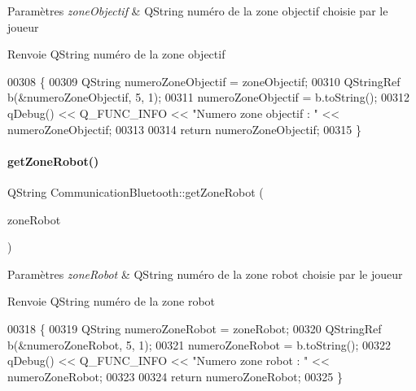 \begin{DoxyParams}{Paramètres}
{\em zone\+Objectif} & Q\+String numéro de la zone objectif choisie par le joueur \\
\hline
\end{DoxyParams}
\begin{DoxyReturn}{Renvoie}
Q\+String numéro de la zone objectif 
\end{DoxyReturn}

\begin{DoxyCode}
00308 \{
00309     QString numeroZoneObjectif = zoneObjectif;
00310     QStringRef b(&numeroZoneObjectif, 5, 1);
00311     numeroZoneObjectif = b.toString();
00312     qDebug() << Q\_FUNC\_INFO << \textcolor{stringliteral}{"Numero zone objectif : "} << numeroZoneObjectif;
00313 
00314     \textcolor{keywordflow}{return} numeroZoneObjectif;
00315 \}
\end{DoxyCode}
\mbox{\label{class_communication_bluetooth_a1660fbcba9b118755a57e46543868f80}} 
\paragraph{\texorpdfstring{get\+Zone\+Robot()}{getZoneRobot()}}
{\footnotesize\ttfamily Q\+String Communication\+Bluetooth\+::get\+Zone\+Robot (\begin{DoxyParamCaption}\item[{Q\+String}]{zone\+Robot }\end{DoxyParamCaption})}


\begin{DoxyParams}{Paramètres}
{\em zone\+Robot} & Q\+String numéro de la zone robot choisie par le joueur \\
\hline
\end{DoxyParams}
\begin{DoxyReturn}{Renvoie}
Q\+String numéro de la zone robot 
\end{DoxyReturn}

\begin{DoxyCode}
00318 \{
00319     QString numeroZoneRobot = zoneRobot;
00320     QStringRef b(&numeroZoneRobot, 5, 1);
00321     numeroZoneRobot = b.toString();
00322     qDebug() << Q\_FUNC\_INFO << \textcolor{stringliteral}{"Numero zone robot : "} << numeroZoneRobot;
00323 
00324     \textcolor{keywordflow}{return} numeroZoneRobot;
00325 \}
\end{DoxyCode}
\mbox{\label{class_communication_bluetooth_a71bd8acb7452d3e27884ce696f7a73d9}} 
